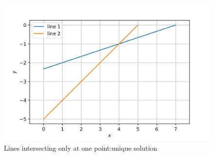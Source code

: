 \documentclass[journal,12pt,twocolumn]{IEEEtran}
\begin{document}
\begin{enumerate}
\begin{figure}[ht]
    \includegraphics[width= \columnwidth]{assignment2d-1.png}
    \caption{Lines intersecting only at one point:unique solution}
    \label{fig:2}
\end{figure}
\end{enumerate}
\end{document}
